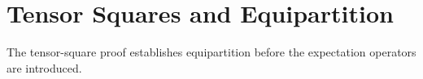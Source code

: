 \chapter{Tensor Squares and Equipartition}
\label{organized:tensor}
\label{chapterfour}
The tensor-square proof establishes equipartition before the expectation operators are introduced.

